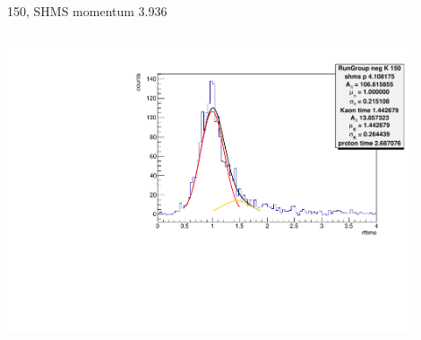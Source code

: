\documentclass[aspectratio=169,xcolor=dvipsnames]{beamer}
\begin{document}
\begin{frame}{150, SHMS momentum 3.936}
\begin{columns}
\begin{column}[T]{0.33\textwidth}
\includegraphics[width = 0.9\textwidth]{results/pid/rftime/rftime_neg_150_5.pdf}
\end{column}
\end{columns}
\end{frame}
\end{document}
